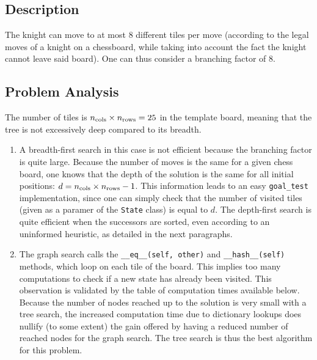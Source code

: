 \documentclass[journal]{IEEEtran}
\newcommand{\py}[1]{\texttt{#1}}
\begin{document}
\subsection{Description}
The knight can move to at most 8 different tiles per move (according to the legal moves of a knight on a chessboard, while taking into account the fact the knight cannot leave said board).
 One can thus consider a branching factor of 8.
 \subsection{Problem Analysis}
 The number of tiles is \(n_{\textnormal{cols}} \times n_{\textnormal{\vphantom{l}rows}} = 25\) in the template board, meaning that the tree is not excessively deep compared to its breadth.
 \begin{enumerate}
  \item A breadth-first search in this case is not efficient because the branching factor is quite large.
  Because the number of moves is the same for a given chess board, one knows that the depth of the solution is the same for all initial positions: \(d = n_{\textnormal{cols}} \times n_{\textnormal{\vphantom{l}rows}} - 1\).
  This information leads to an easy \py{goal_test} implementation, since one can simply check that the number of visited tiles (given as a paramer of the \py{State} class) is equal to \(d\).
  The depth-first search is quite efficient when the successors are sorted, even according to an uninformed heuristic, as detailed in the next paragraphs.
  \item The graph search calls the \py{__eq__(self, other)} and \py{__hash__(self)} methods, which loop on each tile of the board.
  This implies too many computations to check if a new state has already been visited.
  This observation is validated by the table of computation times available below.
  Because the number of nodes reached up to the solution is very small with a tree search, the increased computation time due to dictionary lookups does nullify (to some extent) the gain offered by having a reduced number of reached nodes for the graph search.
  The tree search is thus the best algorithm for this problem.
 \end{enumerate}
\end{document}
